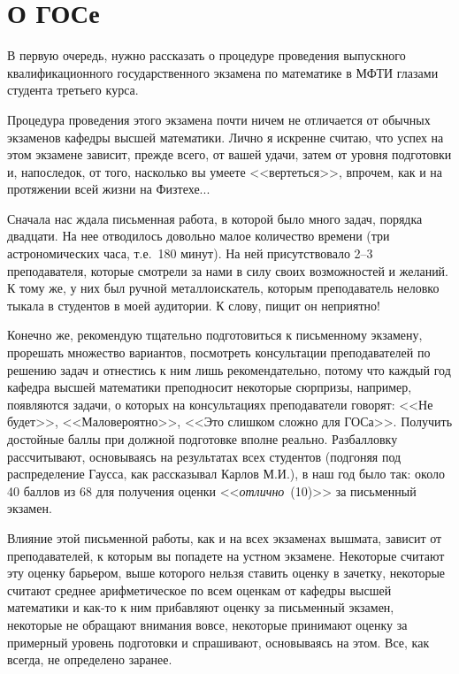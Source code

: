 \chapter[О ГОСе]{О ГОСе\footnotemark}
В первую очередь, нужно рассказать о процедуре проведения выпускного квалификационного государственного экзамена по математике в МФТИ глазами студента третьего курса. 

Процедура проведения этого экзамена почти ничем не отличается от обычных экзаменов кафедры высшей математики. 
Лично я искренне считаю, что успех на этом экзамене зависит, прежде всего, от вашей удачи, затем от уровня подготовки и, напоследок, от того, насколько вы умеете <<вертеться>>, впрочем, как и на протяжении всей жизни на Физтехе...

Сначала нас ждала письменная работа, в которой было много задач, порядка двадцати. На нее отводилось довольно малое количество времени (три астрономических часа, т.е.~180 минут). На ней присутствовало 2--3 преподавателя, которые смотрели за нами в силу своих возможностей и желаний. К тому же, у них был ручной металлоискатель, которым преподаватель неловко тыкала в студентов в моей аудитории. К слову, пищит он неприятно! 

Конечно же, рекомендую тщательно подготовиться к письменному экзамену, прорешать множество вариантов, посмотреть консультации преподавателей по решению задач и отнестись к ним лишь рекомендательно, потому что каждый год кафедра высшей математики преподносит некоторые сюрпризы, например, появляются задачи, о которых на консультациях преподаватели говорят: <<Не будет>>, <<Маловероятно>>, <<Это слишком сложно для ГОСа>>. Получить достойные баллы при должной подготовке вполне реально. Разбалловку рассчитывают, основываясь на результатах всех студентов (подгоняя под распределение Гаусса, как рассказывал Карлов М.И.), в наш год было так: около 40 баллов из 68 для получения оценки <<\textit{отлично}~(10)>> за письменный экзамен.

Влияние этой письменной работы, как и на всех экзаменах вышмата, зависит от преподавателей, к которым вы попадете на устном экзамене. Некоторые считают эту оценку барьером, выше которого нельзя ставить оценку в зачетку, некоторые считают среднее арифметическое по всем оценкам от кафедры высшей математики и как-то к ним прибавляют оценку за письменный экзамен, некоторые не обращают внимания вовсе, некоторые принимают оценку за примерный уровень подготовки и спрашивают, основываясь на этом. Все, как всегда, не определено заранее.

